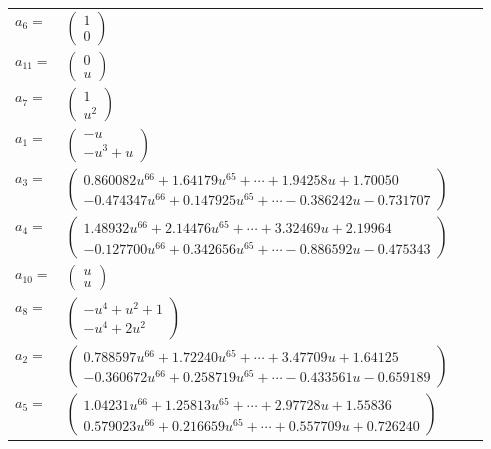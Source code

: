 \documentclass[1p]{elsarticle_modified}
\theoremstyle{definition}
\begin{document}
\begin{tabular}{m{7pt} m{180pt} m{7pt} m{180pt} }
\flushright $a_{6}=$&$\begin{pmatrix}1\\0\end{pmatrix}$ \\
\flushright $a_{11}=$&$\begin{pmatrix}0\\u\end{pmatrix}$ \\
\flushright $a_{7}=$&$\begin{pmatrix}1\\u^2\end{pmatrix}$ \\
\flushright $a_{1}=$&$\begin{pmatrix}- u\\- u^3+u\end{pmatrix}$ \\
\flushright $a_{3}=$&$\begin{pmatrix}0.860082 u^{66}+1.64179 u^{65}+\cdots+1.94258 u+1.70050\\-0.474347 u^{66}+0.147925 u^{65}+\cdots-0.386242 u-0.731707\end{pmatrix}$ \\
\flushright $a_{4}=$&$\begin{pmatrix}1.48932 u^{66}+2.14476 u^{65}+\cdots+3.32469 u+2.19964\\-0.127700 u^{66}+0.342656 u^{65}+\cdots-0.886592 u-0.475343\end{pmatrix}$ \\
\flushright $a_{10}=$&$\begin{pmatrix}u\\u\end{pmatrix}$ \\
\flushright $a_{8}=$&$\begin{pmatrix}- u^4+u^2+1\\- u^4+2 u^2\end{pmatrix}$ \\
\flushright $a_{2}=$&$\begin{pmatrix}0.788597 u^{66}+1.72240 u^{65}+\cdots+3.47709 u+1.64125\\-0.360672 u^{66}+0.258719 u^{65}+\cdots-0.433561 u-0.659189\end{pmatrix}$ \\
\flushright $a_{5}=$&$\begin{pmatrix}1.04231 u^{66}+1.25813 u^{65}+\cdots+2.97728 u+1.55836\\0.579023 u^{66}+0.216659 u^{65}+\cdots+0.557709 u+0.726240\end{pmatrix}$ \\

\end{tabular}
\end{document}
